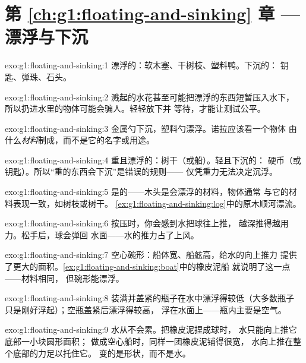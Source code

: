 \section*{第 \ref{ch:g1:floating-and-sinking} 章 --- 漂浮与下沉}

\begin{solution}{exo:g1:floating-and-sinking:1}
漂浮的：软木塞、干树枝、塑料鸭。下沉的：
钥匙、弹珠、石头。
\end{solution}

\begin{solution}{exo:g1:floating-and-sinking:2}
溅起的水花甚至可能把漂浮的东西短暂压入水下，
所以扔进水里的物体可能会骗人。轻轻放下并
等待，才能让测试公平。
\end{solution}

\begin{solution}{exo:g1:floating-and-sinking:3}
金属勺下沉，塑料勺漂浮。诺拉应该看一个物体
由什么\emph{材料}制成，而不是它的名字或用途。
\end{solution}

\begin{solution}{exo:g1:floating-and-sinking:4}
重且漂浮的：树干（或船）。轻且下沉的：
硬币（或钥匙）。所以“重的东西会下沉”是错误的规则——
仅凭重力无法决定沉浮。
\end{solution}

\begin{solution}{exo:g1:floating-and-sinking:5}
是的——木头是会漂浮的材料，物体通常
与它的材料表现一致，如树枝或树干。
\cref{ex:g1:floating-and-sinking:log}中的原木顺河漂流。
\end{solution}

\begin{solution}{exo:g1:floating-and-sinking:6}
按压时，你会感到水把球往上推，
越深推得越用力。松手后，球会弹回
水面——水的推力占了上风。
\end{solution}

\begin{solution}{exo:g1:floating-and-sinking:7}
空心碗形：船体宽、船舷高，给水的向上推力
提供了更大的面积。\cref{ex:g1:floating-and-sinking:boat}中的橡皮泥船
就说明了这一点——材料相同，
但碗形能漂浮。
\end{solution}

\begin{solution}{exo:g1:floating-and-sinking:8}
装满并盖紧的瓶子在水中漂浮得较低（大多数瓶子
只是刚好浮起）；空瓶盖紧后漂浮得较高，
浮在水面上——瓶内主要是空气。
\end{solution}

\begin{solution}{exo:g1:floating-and-sinking:9}
水从不会累。把橡皮泥捏成球时，
水只能向上推它底部一小块圆形面积；
做成空心船时，同样一团橡皮泥铺得很宽，
水向上推在整个底部的力足以托住它。
变的是形状，而不是水。
\end{solution}
